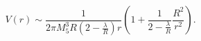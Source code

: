 \begin{equation}
\label{rev7}
V(r) \sim \frac{1}{2\pi M_5^3 R \left( 2 - \frac{\lambda}{R} \right) r}
\left( 1 + \frac{1}{2 - \frac{\lambda}{R}} \frac{R^2}{r^2} \right).
\end{equation}

